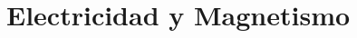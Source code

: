 \documentclass[12pt, a4paper, twoside]{book}
\begin{document}
% 
% 
% 

% 
% 
% 

% 
% 
% 

\chapter{Electricidad y Magnetismo}

% 
% 
% 

% 
% 
% 

% 
% 
% 

% 
% 
% 

% 
% 
% 

% 
% 
% 

% 
% 
% 

% 
% 
% 

\end{document}
